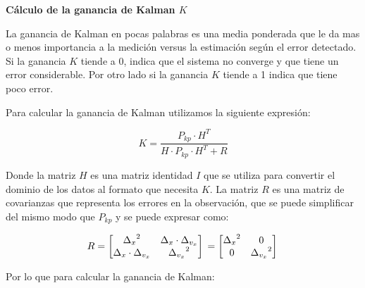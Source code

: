 \textbf{Cálculo de la ganancia de Kalman $K$} \mbox{} \vspace{10pt}

La ganancia de Kalman en pocas palabras es una media ponderada que le da mas o menos importancia a la medición versus la estimación según el error detectado. Si la ganancia $K$ tiende a 0, indica que el sistema no converge y que tiene un error considerable. Por otro lado si la ganancia $K$ tiende a 1 indica que tiene poco error.

Para calcular la ganancia de Kalman utilizamos la siguiente expresión:

$$ K = \frac{P_{kp} \cdot H^T}
            {H \cdot P_{kp} \cdot H^T + R}
$$

Donde la matriz $H$ es una matriz identidad $I$ que se utiliza para convertir el dominio de los datos al formato que necesita $K$. La matriz $R$ es una matriz de covarianzas que representa los errores en la observación, que se puede simplificar del mismo modo que $P_{kp}$ y se puede expresar como:

 $$ R =
    \begin{bmatrix}
    {\Delta_x}^2 & \Delta_x \cdot \Delta_{v_x} \\
    \Delta_x \cdot \Delta_{v_x} & {\Delta_{v_x}}^2 \\
    \end{bmatrix} \\ 
    =
    \begin{bmatrix}
    {\Delta_x}^2 & 0 \\
    0 & {\Delta_{v_x}}^2 \\
    \end{bmatrix} \\ 
$$

Por lo que para calcular la ganancia de Kalman:

